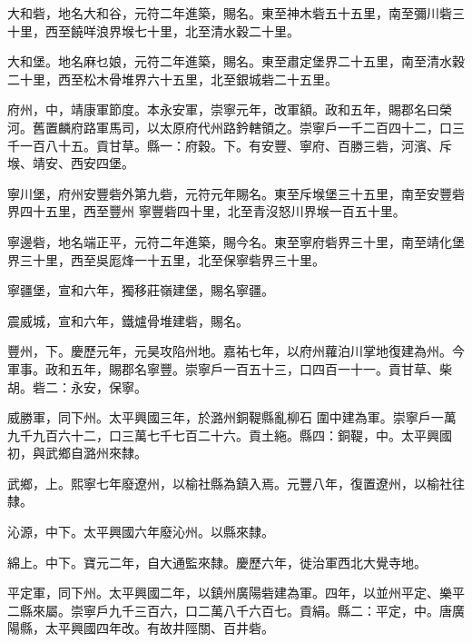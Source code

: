 \begin{pinyinscope}
 大和砦，地名大和谷，元符二年進築，賜名。東至神木砦五十五里，南至彌川砦三十里，西至饒咩浪界堠七十里，北至清水穀二十里。



 大和堡。地名麻乜娘，元符二年進築，賜名。東至肅定堡界二十五里，南至清水穀二十里，西至松木骨堆界六十五里，北至銀城砦二十五里。



 府州，中，靖康軍節度。本永安軍，崇寧元年，改軍額。政和五年，賜郡名曰榮河。舊置麟府路軍馬司，以太原府代州路鈐轄領之。崇寧戶一千二百四十二，口三千一百八十五。貢甘草。縣一：府穀。下。有安豐、寧府、百勝三砦，河濱、斥堠、靖安、西安四堡。



 寧川堡，府州安豐砦外第九砦，元符元年賜名。東至斥堠堡三十五里，南至安豐砦界四十五里，西至豐州
 寧豐砦四十里，北至青沒怒川界堠一百五十里。



 寧邊砦，地名端正平，元符二年進築，賜今名。東至寧府砦界三十里，南至靖化堡界三十里，西至吳厖烽一十五里，北至保寧砦界三十里。



 寧疆堡，宣和六年，獨移莊嶺建堡，賜名寧疆。



 震威城，宣和六年，鐵爐骨堆建砦，賜名。



 豐州，下。慶歷元年，元昊攻陷州地。嘉祐七年，以府州蘿泊川掌地復建為州。今軍事。政和五年，賜郡名寧豐。崇寧戶一百五十三，口四百一十一。貢甘草、柴胡。砦二：永安，保寧。



 威勝軍，同下州。太平興國三年，於潞州銅鞮縣亂柳石
 圍中建為軍。崇寧戶一萬九千九百六十二，口三萬七千七百二十六。貢土絁。縣四：銅鞮，中。太平興國初，與武鄉自潞州來隸。



 武鄉，上。熙寧七年廢遼州，以榆社縣為鎮入焉。元豐八年，復置遼州，以榆社往隸。



 沁源，中下。太平興國六年廢沁州。以縣來隸。



 綿上。中下。寶元二年，自大通監來隸。慶歷六年，徙治軍西北大覺寺地。



 平定軍，同下州。太平興國二年，以鎮州廣陽砦建為軍。四年，以並州平定、樂平二縣來屬。崇寧戶九千三百六，口二萬八千六百七。貢絹。縣二：平定，中。唐廣陽縣，太平興國四年改。有故井陘關、百井砦。




\end{pinyinscope}
